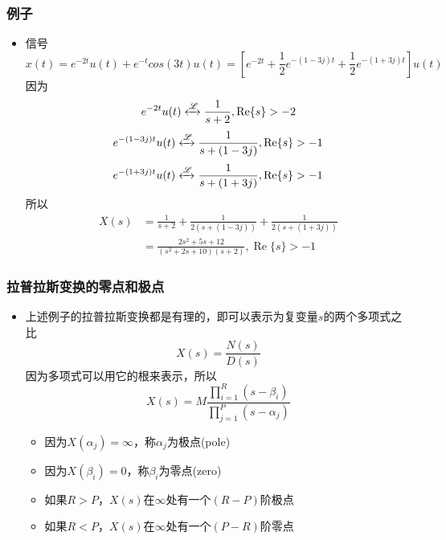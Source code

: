 \documentclass[CJKutf8,dvipsnames,table]{beamer}
\begin{document}
\begin{CJK*}{UTF8}{song}
  \begin{frame}
    \frametitle{例子}
    \begin{itemize}
    \item 信号
    \[
    	x(t) = e^{-2t}u(t)+e^{-t}cos(3t)u(t) = [e^{-2t}+\frac{1}{2}e^{-(1-3j)t}+\frac{1}{2}e^{-(1+3j)t}]u(t)
    \]
    因为
    \[
    	e^{-2t}u(t) \xleftrightarrow{\mathscr{L}} \frac{1}{s+2}, \operatorname{Re}\{s\}>-2 
    \]
	\[
    	e^{-(1-3j)t}u(t) \xleftrightarrow{\mathscr{L}} \frac{1}{s+(1-3j)}, \operatorname{Re}\{s\}>-1 
    \]
	\[
    	e^{-(1+3j)t}u(t) \xleftrightarrow{\mathscr{L}} \frac{1}{s+(1+3j)}, \operatorname{Re}\{s\}>-1
    \]
    所以
    \begin{align*}
    	X(s) & = \frac{1}{s+2} + \frac{1}{2(s+(1-3j))} + \frac{1}{2(s+(1+3j))} \\
	         & = \frac{2s^2+5s+12}{(s^2+2s+10)(s+2)}, \operatorname{Re}\{s\}>-1
    \end{align*}
    \end{itemize}
  \end{frame}  
         
  \begin{frame}
    \frametitle{拉普拉斯变换的零点和极点}
    \begin{itemize}
    \item 上述例子的拉普拉斯变换都是有理的，即可以表示为复变量$s$的两个多项式之比
    \[
    	X(s) = \frac{N(s)}{D(s)}
    \]
    因为多项式可以用它的根来表示，所以
	\[
		X(s) = M\frac{\prod_{i=1}^{R}(s-\beta_i)}{\prod_{j=1}^{P}(s-\alpha_j)}
	\]   
    	\begin{itemize}
    	\item 因为$X(\alpha_j)=\infty$，称$\alpha_j$为极点(pole)
    	\item 因为$X(\beta_i)=0$，称$\beta_i$为零点(zero)
		\item 如果$R > P$，$X(s)$在$\infty$处有一个$(R-P)$阶极点
		\item 如果$R < P$，$X(s)$在$\infty$处有一个$(P-R)$阶零点
    	\end{itemize}	 
    \end{itemize}
  \end{frame}  
  

\end{CJK*}
\end{document}
